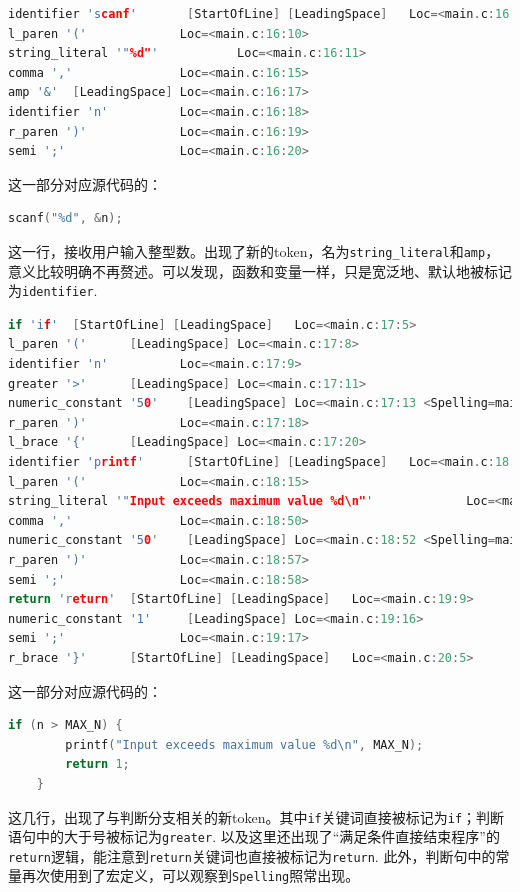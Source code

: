 \documentclass[UTF8,a4paper,10pt]{ctexart}
\begin{document}
\vspace{1em}

\begin{lstlisting}[title=词法分析片段 4,frame=trbl,language={C++}]
identifier 'scanf'       [StartOfLine] [LeadingSpace]   Loc=<main.c:16:5>
l_paren '('             Loc=<main.c:16:10>
string_literal '"%d"'           Loc=<main.c:16:11>
comma ','               Loc=<main.c:16:15>
amp '&'  [LeadingSpace] Loc=<main.c:16:17>
identifier 'n'          Loc=<main.c:16:18>
r_paren ')'             Loc=<main.c:16:19>
semi ';'                Loc=<main.c:16:20>
\end{lstlisting}

这一部分对应源代码的：
\begin{lstlisting}[frame=trbl,language={C++}]
    scanf("%d", &n);
\end{lstlisting}
这一行，接收用户输入整型数。出现了新的token，名为\texttt{string\_literal}和\texttt{amp}，意义比较明确不再赘述。可以发现，函数和变量一样，只是宽泛地、默认地被标记为\texttt{identifier}.


\vspace{1em}


\begin{lstlisting}[title=词法分析片段 5,frame=trbl,language={C++}]
if 'if'  [StartOfLine] [LeadingSpace]   Loc=<main.c:17:5>
l_paren '('      [LeadingSpace] Loc=<main.c:17:8>
identifier 'n'          Loc=<main.c:17:9>
greater '>'      [LeadingSpace] Loc=<main.c:17:11>
numeric_constant '50'    [LeadingSpace] Loc=<main.c:17:13 <Spelling=main.c:3:15>>
r_paren ')'             Loc=<main.c:17:18>
l_brace '{'      [LeadingSpace] Loc=<main.c:17:20>
identifier 'printf'      [StartOfLine] [LeadingSpace]   Loc=<main.c:18:9>
l_paren '('             Loc=<main.c:18:15>
string_literal '"Input exceeds maximum value %d\n"'             Loc=<main.c:18:16>
comma ','               Loc=<main.c:18:50>
numeric_constant '50'    [LeadingSpace] Loc=<main.c:18:52 <Spelling=main.c:3:15>>
r_paren ')'             Loc=<main.c:18:57>
semi ';'                Loc=<main.c:18:58>
return 'return'  [StartOfLine] [LeadingSpace]   Loc=<main.c:19:9>
numeric_constant '1'     [LeadingSpace] Loc=<main.c:19:16>
semi ';'                Loc=<main.c:19:17>
r_brace '}'      [StartOfLine] [LeadingSpace]   Loc=<main.c:20:5>
\end{lstlisting}

这一部分对应源代码的：
\begin{lstlisting}[frame=trbl,language={C++}]
    if (n > MAX_N) {
        printf("Input exceeds maximum value %d\n", MAX_N);
        return 1;
    }
\end{lstlisting}
这几行，出现了与判断分支相关的新token。其中\texttt{if}关键词直接被标记为\texttt{if}；判断语句中的大于号被标记为\texttt{greater}. 以及这里还出现了“满足条件直接结束程序”的\texttt{return}逻辑，能注意到\texttt{return}关键词也直接被标记为\texttt{return}. 此外，判断句中的常量再次使用到了宏定义，可以观察到\texttt{Spelling}照常出现。
\end{document}
